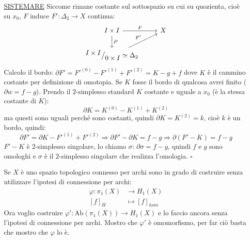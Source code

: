 \documentclass[10pt, twoside=false, x11names]{scrbook}
\newenvironment{proof}{{\textbf{Dimostrazione}:}}{\hfill $\square$}
\renewcommand{\phi}{\varphi}
\newcommand{\Ab}[1]{\mathrm{Ab}\left( #1 \right)}
\newcommand*\quot[2]{{^{\textstyle #1}\big/_{\textstyle #2}}}
\begin{document}
\begin{proof}
  \underline{SISTEMARE}
  Siccome rimane costante sul sottospazio su cui su quozienta, cioè su $ x_0 $,
  $ F $ induce $ F' \colon \Delta_2 \to X $ continua:
  \[
    \begin{tikzcd}
      I \times I \arrow{r}{F} \arrow{d}{P} & X \\
      \quot{I \times I}{0 \times I} \simeq \Delta_2 \arrow{ur}{F'}
    \end{tikzcd}
  \]
  Calcolo il bordo: $ \partial F' = F'^{(0)} - F'^{(1)} + F'^{(2)} = K - g + f $
  dove $ K $ è il cammino costante per definizione di omotopia. Se $ K $
  fosse il bordo di qualcosa avrei finito ($ \partial w = f - g $). Prendo il $ 2 $-simplesso
  standard $ K $ costante e uguale a $ x_0 $ (è la stessa costante di $ K $):
  \[
    \partial K = K^{(0)} - K^{(1)} + K^{(2)}
  \]
  ma questi sono uguali perché sono costanti, quindi $ \partial K = K^{(2)} = k $, cioè $ k $
  è un bordo, quindi:
  \[
    \partial F' = \partial K - F'^{(1)} + F'^{(2)} \Rightarrow \partial F' - \partial K = f - g \Rightarrow \partial(F' - K) = f - g
  \]
  $ F' - K $ è $ 2 $-simplesso singolare, lo chiamo $ \sigma $: $ \partial \sigma = f - g $, quindi
  $ f $ e $ g $ sono omologhi e $ \sigma $ è il $ 2 $-simplesso singolare che realizza
  l'omologia.
\end{proof}

Se $ X $ è uno spazio topologico connesso per archi sono in grado di costruire
senza utilizzare l'ipotesi di connessione per archi:
\begin{align*}
  \phi:  \pi_1(X) & \to H_1(X) \\
  [f]_H & \mapsto [f]_{hom}
\end{align*}
Ora voglio costruire $ \phi' \colon \Ab{\pi_1(X)} \to H_1(X) $ e lo faccio ancora
senza l'ipotesi di connessione per archi. Mostro che $ \phi' $ è omomorfismo,
per far ciò basta che mostro che $ \phi $ lo è.
\end{document}
